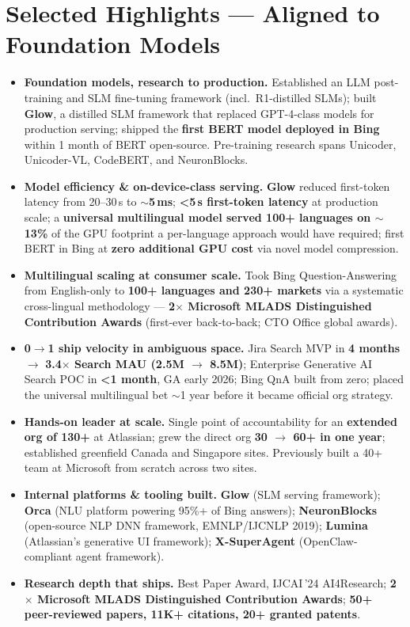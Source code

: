 \documentclass[10.5pt,letterpaper]{article}
\begin{document}
\section*{Selected Highlights --- Aligned to Foundation Models}
\begin{itemize}
  \item \textbf{Foundation models, research to production.} Established an LLM post-training and SLM fine-tuning framework (incl.\ R1-distilled SLMs); built \textbf{Glow}, a distilled SLM framework that replaced GPT-4-class models for production serving; shipped the \textbf{first BERT model deployed in Bing} within 1 month of BERT open-source. Pre-training research spans Unicoder, Unicoder-VL, CodeBERT, and NeuronBlocks.
  \item \textbf{Model efficiency \& on-device-class serving.} \textbf{Glow} reduced first-token latency from 20--30\,s to \textbf{$\sim$5\,ms}; \textbf{<5\,s first-token latency} at production scale; a \textbf{universal multilingual model served 100+ languages on $\sim$13\%} of the GPU footprint a per-language approach would have required; first BERT in Bing at \textbf{zero additional GPU cost} via novel model compression.
  \item \textbf{Multilingual scaling at consumer scale.} Took Bing Question-Answering from English-only to \textbf{100+ languages and 230+ markets} via a systematic cross-lingual methodology --- \textbf{2$\times$ Microsoft MLADS Distinguished Contribution Awards} (first-ever back-to-back; CTO Office global awards).
  \item \textbf{0$\to$1 ship velocity in ambiguous space.} Jira Search MVP in \textbf{4 months} $\to$ \textbf{3.4$\times$ Search MAU (2.5M $\to$ 8.5M)}; Enterprise Generative AI Search POC in \textbf{<1 month}, GA early 2026; Bing QnA built from zero; placed the universal multilingual bet $\sim$1 year before it became official org strategy.
  \item \textbf{Hands-on leader at scale.} Single point of accountability for an \textbf{extended org of 130+} at Atlassian; grew the direct org \textbf{30 $\to$ 60+ in one year}; established greenfield Canada and Singapore sites. Previously built a 40+ team at Microsoft from scratch across two sites.
  \item \textbf{Internal platforms \& tooling built.} \textbf{Glow} (SLM serving framework); \textbf{Orca} (NLU platform powering 95\%+ of Bing answers); \textbf{NeuronBlocks} (open-source NLP DNN framework, EMNLP/IJCNLP 2019); \textbf{Lumina} (Atlassian's generative UI framework); \textbf{X-SuperAgent} (OpenClaw-compliant agent framework).
  \item \textbf{Research depth that ships.} Best Paper Award, IJCAI\,'24 AI4Research; \textbf{2$\times$ Microsoft MLADS Distinguished Contribution Awards}; \textbf{50+ peer-reviewed papers, 11K+ citations, 20+ granted patents}.
\end{itemize}
\end{document}
